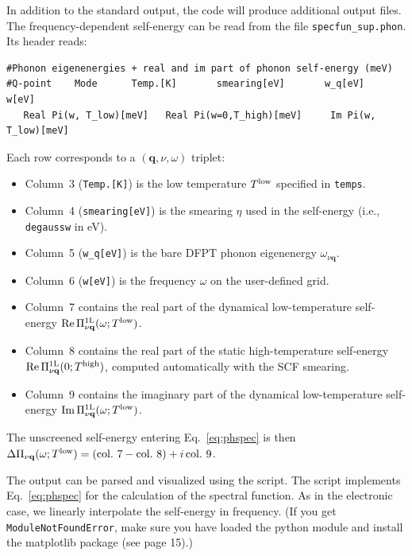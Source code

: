\documentclass[a4paper,11pt,serif]{article}
\newcommand{\mb}[1]{\mathbf{#1}}
\newcommand{\nuq}[0]{{\nu\mb{q}}}
\begin{document}
\vspace{0.5cm}

In addition to the standard output, the code will produce additional output files.
%
The frequency-dependent self-energy can be read from the file \texttt{specfun\_sup.phon}.
%
Its header reads:
{\color{cverb} \small
\begin{verbatim}
#Phonon eigenenergies + real and im part of phonon self-energy (meV)
#Q-point    Mode      Temp.[K]       smearing[eV]       w_q[eV]    w[eV]
   Real Pi(w, T_low)[meV]   Real Pi(w=0,T_high)[meV]     Im Pi(w, T_low)[meV]
\end{verbatim}
}

Each row corresponds to a $(\mb{q}, \nu, \omega)$ triplet:
\begin{footnotesize}
\begin{itemize}
   \item Column~3 (\texttt{Temp.[K]}) is the low temperature $T^{\rm low}$ specified in \texttt{temps}.
   \item Column~4 (\texttt{smearing[eV]}) is the smearing $\eta$ used in the self-energy (i.e., \texttt{degaussw} in eV).
   \item Column~5 (\texttt{w\_q[eV]}) is the bare DFPT phonon eigenenergy $\omega_\nuq$.
   \item Column~6 (\texttt{w[eV]}) is the frequency $\omega$ on the user-defined grid.
   \item Column~7 contains the real part of the dynamical low-temperature self-energy
         $\mathrm{Re}\,\Pi^{\rm 1L}_\nuq(\omega; T^{\rm low})$.
   \item Column~8 contains the real part of the static high-temperature self-energy
         $\mathrm{Re}\,\Pi^{\rm 1L}_\nuq(0; T^{\rm high})$, computed automatically with the SCF smearing.
   \item Column~9 contains the imaginary part of the dynamical low-temperature self-energy
         $\mathrm{Im}\,\Pi^{\rm 1L}_\nuq(\omega; T^{\rm low})$.
\end{itemize}
\end{footnotesize}
The unscreened self-energy entering Eq.~\eqref{eq:phspec} is then $\Delta\Pi_\nuq(\omega; T^{\rm low}) = (\mathrm{col.~7} - \mathrm{col.~8}) + i\, \mathrm{col.~9}$.


\vspace{0.2cm}

The output can be parsed and visualized using the  script.
The script implements Eq.~\eqref{eq:phspec} for the calculation of the spectral function.
As in the electronic case, we linearly interpolate the self-energy in frequency.
(If you get \texttt{ModuleNotFoundError}, make sure you have loaded the python module and install the matplotlib package (see page 15).)
\end{document}
